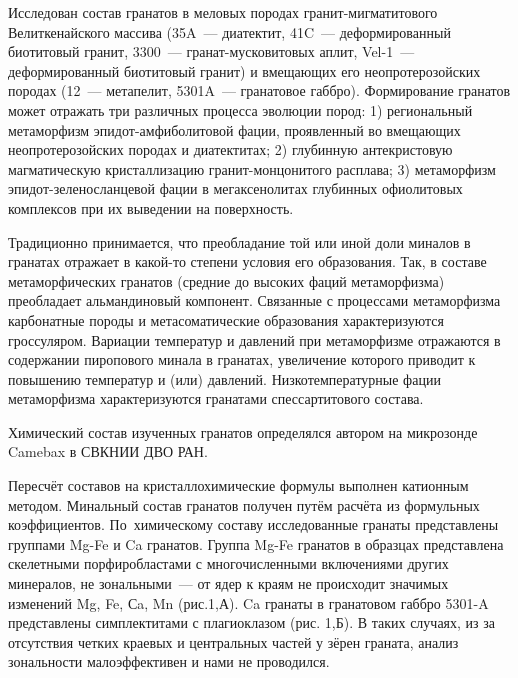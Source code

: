  

\makeProcTitle
{}

Исследован состав гранатов в меловых породах гранит-мигматитового Велиткенайского массива (35A~--- диатектит, 41C~--- деформированный биотитовый гранит, 3300~--- гранат-мусковитовых аплит, Vel-1~--- деформированный биотитовый гранит) и вмещающих его неопротерозойских породах (12~--- метапелит, 5301A~--- гранатовое габбро).  Формирование гранатов может отражать три различных процесса эволюции пород: 1) региональный метаморфизм эпидот-амфиболитовой фации, проявленный во вмещающих неопротерозойских породах и диатектитах; 2) глубинную антекристовую магматическую кристаллизацию гранит-монцонитого расплава; 3) метаморфизм эпидот-зеленосланцевой фации в мегаксенолитах глубинных офиолитовых комплексов при их выведении на поверхность.

Традиционно принимается, что преобладание той или иной доли миналов в гранатах отражает в какой-то степени  условия его образования.  Так, в составе метаморфических гранатов  (средние до высоких фаций метаморфизма) преобладает альмандиновый компонент. Связанные с процессами метаморфизма карбонатные породы и метасоматические образования характеризуются гроссуляром. Вариации температур и давлений при метаморфизме отражаются  в содержании пиропового минала в гранатах, увеличение которого приводит к повышению температур и (или) давлений. Низкотемпературные фации метаморфизма характеризуются гранатами спессартитового состава.

Химический состав изученных гранатов определялся автором на микрозонде Camebax в СВКНИИ ДВО РАН.

Пересчёт составов на кристаллохимические формулы выполнен катионным методом. Минальный состав гранатов получен путём расчёта из формульных коэффициентов. По~химическому составу исследованные гранаты представлены группами Mg-Fe и Ca гранатов. Группа Mg-Fe гранатов в образцах представлена  скелетными порфиробластами с многочисленными включениями других минералов, не  зональными~--- от ядер к краям не происходит значимых изменений Mg, Fe, Сa, Mn (рис.1,А). Ca гранаты в гранатовом габбро 5301-A представлены симплектитами с плагиоклазом (рис. 1,Б).  В таких случаях, из за отсутствия четких  краевых и  центральных частей у зёрен граната, анализ зональности малоэффективен и нами не проводился.

